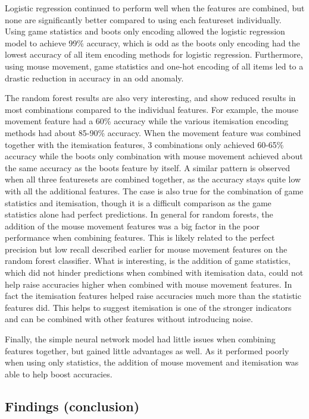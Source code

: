 \documentclass[Report.tex]{subfiles}
\begin{document}
Logistic regression continued to perform well when the features are combined, but none are significantly better compared to using each featureset individually. Using game statistics and boots only encoding allowed the logistic regression model to achieve 99\% accuracy, which is odd as the boots only encoding had the lowest accuracy of all item encoding methods for logistic regression. Furthermore, using mouse movement, game statistics and one-hot encoding of all items led to a drastic reduction in accuracy in an odd anomaly.  

The random forest results are also very interesting, and show reduced results in most combinations compared to the individual features. For example, the mouse movement feature had a 60\% accuracy while the various itemisation encoding methods had about 85-90\% accuracy. When the movement feature was combined together with the itemisation features, 3 combinations only achieved 60-65\% accuracy while the boots only combination with mouse movement achieved about the same accuracy as the boots feature by itself. A similar pattern is observed when all three featuresets are combined together, as the accuracy stays quite low with all the additional features. The case is also true for the combination of game statistics and itemisation, though it is a difficult comparison as the game statistics alone had perfect predictions. In general for random forests, the addition of the mouse movement features was a big factor in the poor performance when combining features. This is likely related to the perfect precision but low recall described earlier for mouse movement features on the random forest classifier. What is interesting, is the addition of game statistics, which did not hinder predictions when combined with itemisation data, could not help raise accuracies higher when combined with mouse movement features. In fact the itemisation features helped raise accuracies much more than the statistic features did. This helps to suggest itemisation is one of the stronger indicators and can be combined with other features without introducing noise. %

Finally, the simple neural network model had little issues when combining features together, but gained little advantages as well. As it performed poorly when using only statistics, the addition of mouse movement and itemisation was able to help boost accuracies. 





\subsection{Findings (conclusion)}
\end{document}
